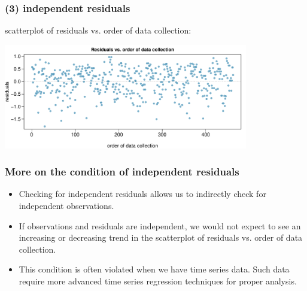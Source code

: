
\begin{frame}[fragile]
\frametitle{(3) independent residuals}

scatterplot of residuals vs. order of data collection: \\

\begin{center}
\includegraphics[width=0.8\textwidth]{8-3_model_cond/figures/beauty/indep_res}
\end{center}


\end{frame}


\begin{frame}
\frametitle{More on the condition of independent residuals}

\begin{itemize}

\item Checking for independent residuals allows us to indirectly check for independent observations.

\item If observations and residuals are independent, we would not expect to see an increasing or decreasing trend in the scatterplot of residuals vs. order of data collection.

\item This condition is often violated when we have time series data. Such data require more advanced time series regression techniques for proper analysis.

\end{itemize}

\end{frame}


